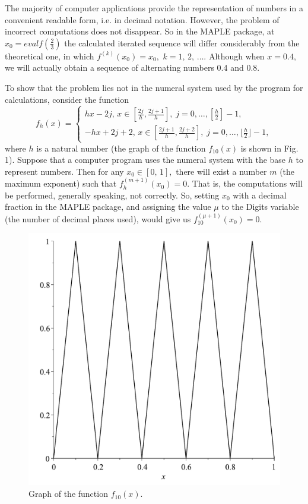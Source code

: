 \documentclass[12pt,a4paper]{amsart}
\begin{document}
The majority of computer applications provide the representation of numbers in a convenient readable form, i.e. in decimal notation. 
However, the problem of incorrect computations does not disappear. So in the MAPLE package, at $x_0=evalf(\frac23)$ the calculated 
iterated sequence will differ considerably from the theoretical one, in which $f^{(k)}(x_0)=x_0,$ $k=1,\,2,\,\ldots$. Although when 
$x=0.4,$ we will actually obtain a sequence of alternating numbers 0.4 and 0.8. 

To show that the problem lies not in the numeral system used by the program for calculations, consider the function
$$f_h(x)=
\left\{\begin{array}{ll}
hx-2j,\,x\in\left[\frac{2j}{h},\frac{2j+1}{h}\right],\;j=0,\ldots,\left[\frac{h}{2}\right]-1, \\
-hx+2j+2,\,x\in\left[\frac{2j+1}{h},\frac{2j+2}{h}\right],\;j=0,\ldots,
\lfloor{\frac{h}{2}}\rfloor-1,
\end{array}\right.$$
where $h$ is a natural number (the graph of the function $f_{10}(x)$ is shown in Fig. 1). Suppose that a computer program uses 
the numeral system with the base $h$ to represent numbers. Then for any $x_0\in[0,\,1],$ there will exist a number $m$ (the 
maximum exponent) such that $f_h^{(m+1)}(x_0)=0.$ That is, the computations will be performed, generally speaking, not correctly.
So, setting $x_0$ with a decimal fraction in the MAPLE package, and assigning the value $\mu$ to the Digits variable (the number of 
decimal places used), would give us $f_{10}^{(\mu+1)}(x_0)=0.$

\begin{figure}[h!]
\centering
\includegraphics[scale=0.28]{Fig1}
\caption{Graph of the function $f_{10}(x)$.} \label{f1}
\end{figure}
\end{document}
